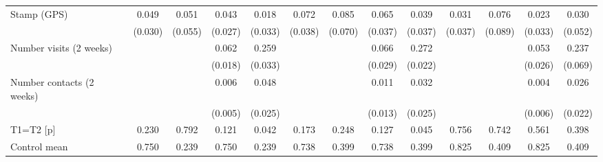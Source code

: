 {\begin{tabular}{l*{12}{c}}
Stamp (GPS)         &       0.049         &       0.051         &       0.043         &       0.018         &       0.072         &       0.085         &       0.065         &       0.039         &       0.031         &       0.076         &       0.023         &       0.030         \\
                    &     (0.030)         &     (0.055)         &     (0.027)         &     (0.033)         &     (0.038)         &     (0.070)         &     (0.037)         &     (0.037)         &     (0.037)         &     (0.089)         &     (0.033)         &     (0.052)         \\
Number visits (2 weeks)&                     &                     &       0.062\sym{**} &       0.259\sym{***}&                     &                     &       0.066\sym{*}  &       0.272\sym{***}&                     &                     &       0.053\sym{*}  &       0.237\sym{**} \\
                    &                     &                     &     (0.018)         &     (0.033)         &                     &                     &     (0.029)         &     (0.022)         &                     &                     &     (0.026)         &     (0.069)         \\
Number contacts (2 weeks)&                     &                     &       0.006         &       0.048         &                     &                     &       0.011         &       0.032         &                     &                     &       0.004         &       0.026         \\
                    &                     &                     &     (0.005)         &     (0.025)         &                     &                     &     (0.013)         &     (0.025)         &                     &                     &     (0.006)         &     (0.022)         \\
\midrule
T1=T2 [p]           &       0.230         &       0.792         &       0.121         &       0.042         &       0.173         &       0.248         &       0.127         &       0.045         &       0.756         &       0.742         &       0.561         &       0.398         \\
Control mean        &       0.750         &       0.239         &       0.750         &       0.239         &       0.738         &       0.399         &       0.738         &       0.399         &       0.825         &       0.409         &       0.825         &       0.409         \\

\end{tabular}}
